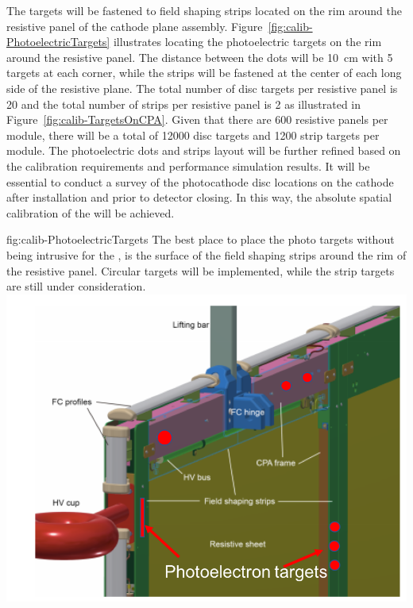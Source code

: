 The targets will be fastened to field shaping strips located on the rim around the resistive panel of the cathode plane assembly. Figure~\ref{fig:calib-PhotoelectricTargets} illustrates locating the photoelectric targets on the rim around the resistive panel. The distance between the dots will be \SI{10}{\cm} with \num{5} targets at each corner, while the strips will be fastened at the center of each long side of the resistive plane. The total number of disc targets per resistive panel is \num{20} and the total number of strips per resistive panel is \num{2} as illustrated in Figure~\ref{fig:calib-TargetsOnCPA}.  Given that there are \num{600} resistive panels per \single module, there will be a total of \num{12000} disc targets and \num{1200} strip targets per module. %
The photoelectric dots and strips layout will be further refined based on the calibration requirements and performance simulation results. It will be essential to conduct a survey of the photocathode disc locations on the cathode after installation and prior to detector closing. In this way, the absolute spatial calibration of the \efield will be achieved. 

\begin{dunefigure}{fig:calib-PhotoelectricTargets}
{The best place to place the photo targets without being intrusive for the \efield, is the surface of the field shaping strips around the rim of the resistive panel. Circular targets will be implemented, while the strip targets are still under consideration.}
\includegraphics[width=0.65\linewidth]{graphics/calib-PhotoelectricTargets.png} 
\end{dunefigure}

